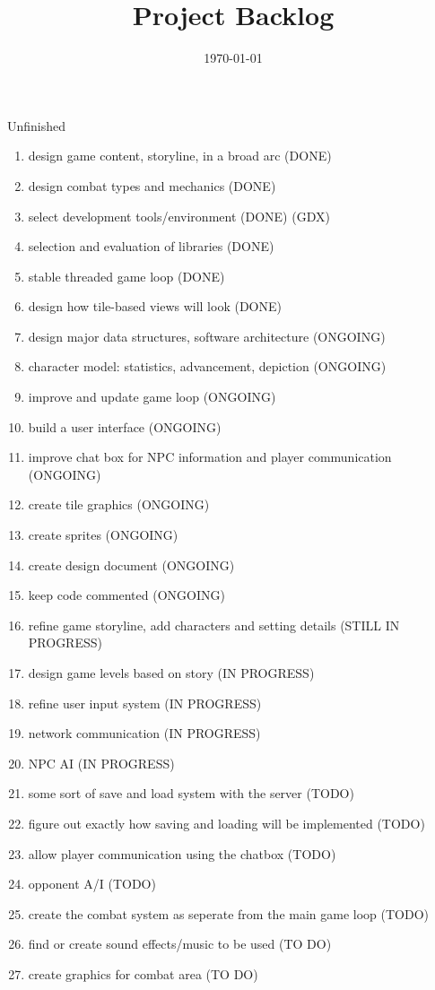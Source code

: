 \documentclass[12pt]{article}
\title{Project Backlog}
\date{\today}
\begin{document}
\maketitle

\begin{section}{Unfinished}
\begin{enumerate}



\item design game content, storyline, in a broad arc (DONE)
\item design combat types and mechanics (DONE)
\item select development tools/environment (DONE) (GDX)
\item selection and evaluation of libraries (DONE)
\item stable threaded game loop (DONE)
\item design how tile-based views will look (DONE)


\item design major data structures, software architecture  (ONGOING) 
\item character model: statistics, advancement, depiction (ONGOING)
\item improve and update game loop (ONGOING)
\item build a user interface (ONGOING)
\item improve chat box for NPC information and player communication (ONGOING)
\item create tile graphics (ONGOING)
\item create sprites (ONGOING)
\item create design document (ONGOING)
\item keep code commented (ONGOING)
	
	
\item refine game storyline, add characters and setting details (STILL IN PROGRESS)
\item design game levels based on story (IN PROGRESS)
\item refine user input system (IN PROGRESS)
\item network communication (IN PROGRESS)
\item NPC AI (IN PROGRESS)


\item some sort of save and load system with the server (TODO)
\item figure out exactly how saving and loading will be implemented (TODO)
\item allow player communication using the chatbox (TODO)
\item opponent A/I (TODO)
\item create the combat system as seperate from the main game loop (TODO)
\item find or create sound effects/music to be used (TO DO)
\item create graphics for combat area (TO DO)


\end{enumerate}
\end{section}
\end{document}
